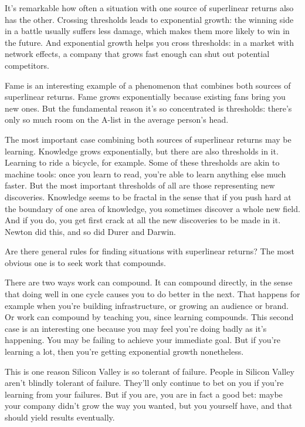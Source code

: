 \documentclass[12pt]{book}
\begin{document}
It's remarkable how often a situation with one source of superlinear
returns also has the other. Crossing thresholds leads to exponential
growth: the winning side in a battle usually suffers less damage, which
makes them more likely to win in the future. And exponential growth
helps you cross thresholds: in a market with network effects, a company
that grows fast enough can shut out potential competitors.

Fame is an interesting example of a phenomenon that combines both
sources of superlinear returns. Fame grows exponentially because
existing fans bring you new ones. But the fundamental reason it's so
concentrated is thresholds: there's only so much room on the A-list in
the average person's head.

The most important case combining both sources of superlinear returns
may be learning. Knowledge grows exponentially, but there are also
thresholds in it. Learning to ride a bicycle, for example. Some of these
thresholds are akin to machine tools: once you learn to read, you're
able to learn anything else much faster. But the most important
thresholds of all are those representing new discoveries. Knowledge
seems to be fractal in the sense that if you push hard at the boundary
of one area of knowledge, you sometimes discover a whole new field. And
if you do, you get first crack at all the new discoveries to be made in
it. Newton did this, and so did Durer and Darwin.

Are there general rules for finding situations with superlinear returns?
The most obvious one is to seek work that compounds.

There are two ways work can compound. It can compound directly, in the
sense that doing well in one cycle causes you to do better in the next.
That happens for example when you're building infrastructure, or growing
an audience or brand. Or work can compound by teaching you, since
learning compounds. This second case is an interesting one because you
may feel you're doing badly as it's happening. You may be failing to
achieve your immediate goal. But if you're learning a lot, then you're
getting exponential growth nonetheless.

This is one reason Silicon Valley is so tolerant of failure. People in
Silicon Valley aren't blindly tolerant of failure. They'll only continue
to bet on you if you're learning from your failures. But if you are, you
are in fact a good bet: maybe your company didn't grow the way you
wanted, but you yourself have, and that should yield results eventually.
\end{document}

